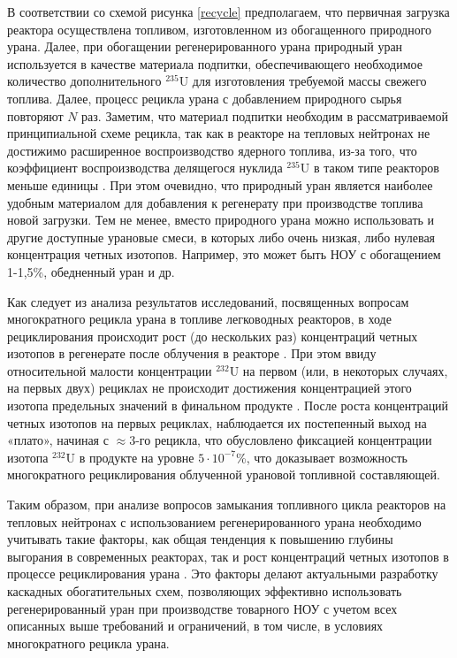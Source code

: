 В соответствии со схемой рисунка \ref{recycle} предполагаем, что первичная загрузка реактора осуществлена топливом, изготовленном из обогащенного природного урана. Далее, при обогащении регенерированного урана природный уран используется в качестве материала подпитки, обеспечивающего необходимое количество дополнительного $^{235}$U для изготовления требуемой массы свежего топлива. Далее, процесс рецикла урана с добавлением природного сырья повторяют $N$ раз. Заметим, что материал подпитки необходим в рассматриваемой принципиальной схеме рецикла, так как в реакторе на тепловых нейтронах не достижимо расширенное воспроизводство ядерного топлива, из-за того, что коэффициент воспроизводства делящегося нуклида $^{235}$U в таком типе реакторов меньше единицы \cite{ignatevVliyanieVidaTopliva2020}. При этом очевидно, что природный уран является наиболее удобным материалом для добавления к регенерату при производстве топлива новой загрузки. Тем не менее, вместо природного урана можно использовать и другие доступные урановые смеси, в которых либо очень низкая, либо нулевая концентрация четных изотопов. Например, это может быть НОУ с обогащением 1-1,5\%, обедненный уран и др.


Как следует из анализа результатов исследований, посвященных вопросам многократного рецикла урана в топливе легководных реакторов, в ходе рециклирования происходит рост (до нескольких раз) концентраций четных изотопов в регенерате после облучения в реакторе \cite{smirnovEvolutionIsotopicComposition2012}. При этом ввиду относительной малости концентрации $^{232}$U на первом (или, в некоторых случаях, на первых двух) рециклах не происходит достижения концентрацией этого изотопа предельных значений в финальном продукте \cite{smirnovApplyingEnrichmentCapacities2018}.
После роста концентраций четных изотопов на первых рециклах, наблюдается их постепенный выход на «плато», начиная с $\approx$3-го рецикла, что обусловлено фиксацией концентрации изотопа $^{232}$U в продукте на уровне $5\cdot10^{-7}$\%, что доказывает возможность многократного рециклирования облученной урановой топливной составляющей.

Таким образом, при анализе вопросов замыкания топливного цикла реакторов на тепловых нейтронах с использованием регенерированного урана необходимо учитывать такие факторы, как общая тенденция к повышению глубины выгорания в современных реакторах, так и рост концентраций четных изотопов в процессе рециклирования урана \cite{andrianovaPovyshenieVygoraniyaTopliva2008}. Это факторы делают актуальными разработку каскадных обогатительных схем, позволяющих эффективно использовать регенерированный уран при производстве товарного НОУ с учетом всех описанных выше требований и ограничений, в том числе, в условиях многократного рецикла урана.

